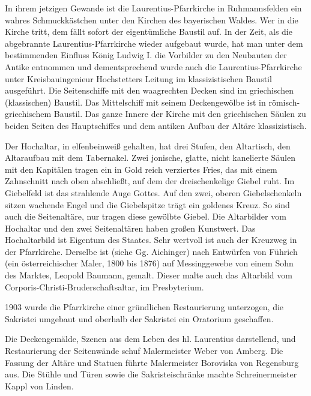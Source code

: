 \documentclass{book}
\begin{document}
In ihrem jetzigen Gewande ist die Laurentius-Pfarrkirche in Ruhmannsfelden ein
wahres Schmuckkästchen unter den Kirchen des bayerischen Waldes. Wer in die
Kirche tritt, dem fällt sofort der eigentümliche Baustil auf. In der Zeit, als
die abgebrannte Laurentius-Pfarrkirche wieder aufgebaut wurde, hat man unter dem
bestimmenden Einfluss König Ludwig I. die Vorbilder zu den Neubauten der Antike
entnommen und dementsprechend wurde auch die Laurentius-Pfarrkirche unter
Kreisbauingenieur Hochstetters Leitung im klassizistischen Baustil ausgeführt.
Die Seitenschiffe mit den waagrechten Decken sind im griechischen (klassischen)
Baustil. Das Mittelschiff mit seinem Deckengewölbe ist in römisch-griechischem
Baustil. Das ganze Innere der Kirche mit den griechischen Säulen zu beiden
Seiten des Hauptschiffes und dem antiken Aufbau der Altäre klassizistisch.

Der Hochaltar, in elfenbeinweiß gehalten, hat drei Stufen, den Altartisch, den
Altaraufbau mit dem Tabernakel. Zwei jonische, glatte, nicht kanelierte Säulen
mit den Kapitälen tragen ein in Gold reich verziertes Fries, das mit einem
Zahnschnitt nach oben abschließt, auf dem der dreischenkelige Giebel ruht. Im
Giebelfeld ist das strahlende Auge Gottes. Auf den zwei, oberen Giebelschenkeln
sitzen wachende Engel und die Giebelspitze trägt ein goldenes Kreuz. So sind
auch die Seitenaltäre, nur tragen diese gewölbte Giebel. Die Altarbilder vom
Hochaltar und den zwei Seitenaltären haben großen Kunstwert. Das Hochaltarbild
ist Eigentum des Staates. Sehr wertvoll ist auch der Kreuzweg in der
Pfarrkirche. Derselbe ist (siehe Gg. Aichinger) nach Entwürfen von Führich (ein
österreichischer Maler, 1800 bis 1876) auf Messinggewebe von einem Sohn des
Marktes, Leopold Baumann, gemalt. Dieser malte auch das Altarbild vom
Corporis-Christi-Bruderschaftsaltar, im Presbyterium.

1903 wurde die Pfarrkirche einer gründlichen Restaurierung unterzogen, die
Sakristei umgebaut und oberhalb der Sakristei ein Oratorium geschaffen.

Die Deckengemälde, Szenen aus dem Leben des hl. Laurentius darstellend, und
Restaurierung der Seitenwände schuf Malermeister Weber von Amberg. Die Fassung
der Altäre und Statuen führte Malermeister Boroviska von Regensburg aus. Die
Stühle und Türen sowie die Sakristeischränke machte Schreinermeister Kappl von
Linden.
\end{document}
